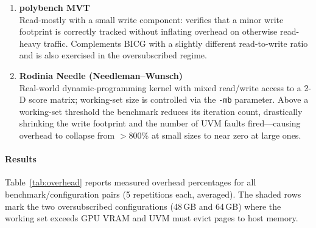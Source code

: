 \begin{enumerate}
    \item \textbf{polybench MVT}
          \\Read-mostly with a small write component: verifies that a minor write
          footprint is correctly tracked without inflating overhead on otherwise
          read-heavy traffic.
          Complements BICG with a slightly different read-to-write ratio and is
          also exercised in the oversubscribed regime.

    \item \textbf{Rodinia Needle (Needleman--Wunsch)}
          \\Real-world dynamic-programming kernel with mixed read/write access to a
          2-D score matrix; working-set size is controlled via the \texttt{-mb}
          parameter.
          Above a working-set threshold the benchmark reduces its iteration count,
          drastically shrinking the write footprint and the number of UVM faults
          fired---causing overhead to collapse from $>$800\% at small sizes to
          near zero at large ones.

\end{enumerate}

\paragraph{Results}
Table~\ref{tab:overhead} reports measured overhead percentages for all
benchmark/configuration pairs (5 repetitions each, averaged).
The shaded rows mark the two oversubscribed configurations (48\,GB and 64\,GB)
where the working set exceeds GPU VRAM and UVM must evict pages to host memory.

